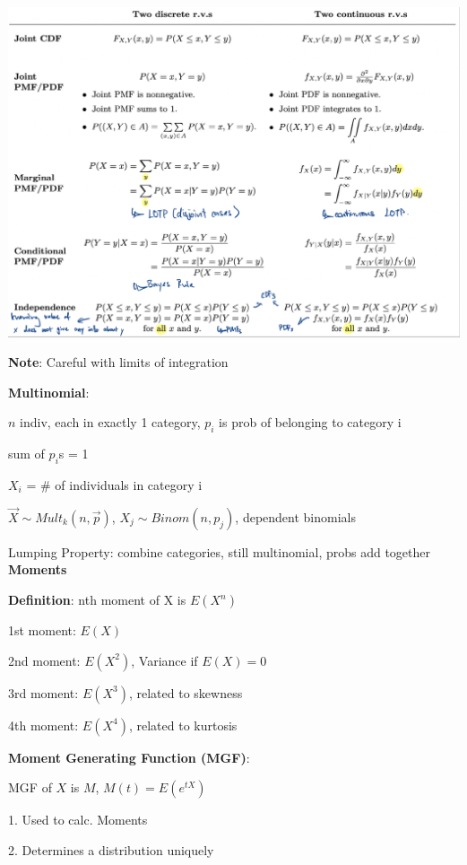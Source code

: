 \documentclass[10pt, a4paper]{article}
\newcommand{\highlight}[1]{{\color{red}\textbf{#1}}}
\newcommand{\red}[1]{{\color{red}#1}}
\newcommand{\header}[1]{{\normalsize\textbf{#1}}}
\begin{document}
\begin{multicols*}{3}

		\includegraphics[scale=0.3]{./assets/jointDist}

		\highlight{Note}: Careful with limits of integration

		\textbf{Multinomial}:

		$n$ indiv, each in exactly 1 category, $p_i$ is prob of belonging to category i

		sum of $p_i$s = 1

		$X_i$ = \# of individuals in category i

		$\vec{X} \sim Mult_k(n, \vec{p})$, $X_j \sim Binom(n, p_j)$, dependent binomials

		\red{Lumping Property}: combine categories, still multinomial, probs add together\\

		\header{Moments}

		\textbf{Definition}: nth moment of X is $E(X^n)$

		1st moment: $E(X)$

		2nd moment: $E(X^2)$, Variance if $E(X) = 0$

		3rd moment: $E(X^3)$, related to skewness

		4th moment: $E(X^4)$, related to kurtosis

		\textbf{Moment Generating Function (MGF)}:

		MGF of $X$ is $M$, $M(t) = E(e^{tX})$

		1. Used to calc. Moments

		2. Determines a distribution uniquely


\end{multicols*}
\end{document}
